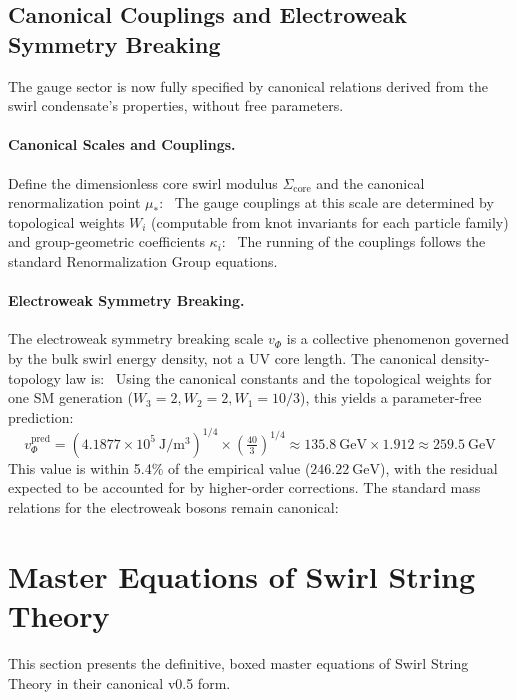 \documentclass[11pt]{article}
\begin{document}
\subsection{Canonical Couplings and Electroweak Symmetry Breaking}
    The gauge sector is now fully specified by canonical relations derived from the swirl condensate's properties, without free parameters.

    \paragraph{Canonical Scales and Couplings.}
        Define the dimensionless core swirl modulus $\Sigma_{\text{core}}$ and the canonical renormalization point $\mu_*$:
        \
        The gauge couplings at this scale are determined by topological weights $W_i$ (computable from knot invariants for each particle family) and group-geometric coefficients $\kappa_i$:
        \
        The running of the couplings follows the standard Renormalization Group equations.

    \paragraph{Electroweak Symmetry Breaking.}
        The electroweak symmetry breaking scale $v_\Phi$ is a collective phenomenon governed by the bulk swirl energy density, not a UV core length. The canonical density-topology law is:
        \
        Using the canonical constants and the topological weights for one SM generation ($W_3=2, W_2=2, W_1=10/3$), this yields a parameter-free prediction:
        \[
            v_\Phi^{\text{pred}} = (4.1877 \times 10^5~\mathrm{J/m^3})^{1/4} \times (\tfrac{40}{3})^{1/4} \approx 135.8~\mathrm{GeV} \times 1.912 \approx 259.5~\mathrm{GeV}
        \]
        This value is within 5.4\% of the empirical value ($246.22~\mathrm{GeV}$), with the residual expected to be accounted for by higher-order corrections. The standard mass relations for the electroweak bosons remain canonical:
        \

\section{Master Equations of Swirl String Theory}
This section presents the definitive, boxed master equations of Swirl String Theory in their canonical v0.5 form.
\end{document}
